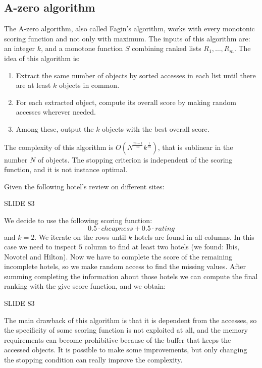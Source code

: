 \documentclass[12pt, a4paper]{report}
\newtheorem[style=M,bodystyle=\normalfont]{theorem}{Theorem}
\newtheorem[style=M,bodystyle=\normalfont]{corollary}{Corollary}
\newtheorem[style=M,bodystyle=\normalfont]{lemma}{Lemma}
\newtheorem[style=M,bodystyle=\normalfont]{definition}{Definition}
\begin{document}
    \subsection{A-zero algorithm}
    The A-zero algorithm, also called Fagin's algorithm, works with every monotonic scoring function and not only with maximum. The inputs
    of this algorithm are: an integer $k$, and a monotone function $S$ combining ranked lists $R_1,\dots,R_m$. The idea of this algorithm is: 
    \begin{enumerate}
        \item Extract the same number of objects by sorted accesses in each list until there are at least $k$ objects in common. 
        \item For each extracted object, compute its overall score by making random accesses wherever needed. 
        \item Among these, output the $k$ objects with the best overall score. 
    \end{enumerate}
    The complexity of this algorithm is $O(N^{\frac{m-1}{m}}k^{\frac{1}{m}})$, that is sublinear in the number $N$ of objects. The 
    stopping criterion is independent of the scoring function, and it is not instance optimal. 
    \begin{example}
        Given the following hotel's review on different sites: 
        
        SLIDE 83

        We decide to use the following scoring function: 
        \[0.5 \cdot cheapness+0.5 \cdot rating\]
        and $k=2$. We iterate on the rows until $k$ hotels are found in all columns. In this case we need to inspect $5$ column to find at
        least two hotels (we found: Ibis, Novotel and Hilton). Now we have to complete the score of the remaining incomplete hotels, so we make 
        random access to find the missing values. After summing completing the information about those hotels we can compute the final ranking 
        with the give score function, and we obtain: 

        SLIDE 83
    \end{example}
    The main drawback of this algorithm is that it is dependent from the accesses, so the specificity of some scoring function is not exploited
    at all, and the memory requirements can become prohibitive because of the buffer that keeps the accessed objects. It is possible to make 
    some improvements, but only changing the stopping condition can really improve the complexity. 
\end{document}
